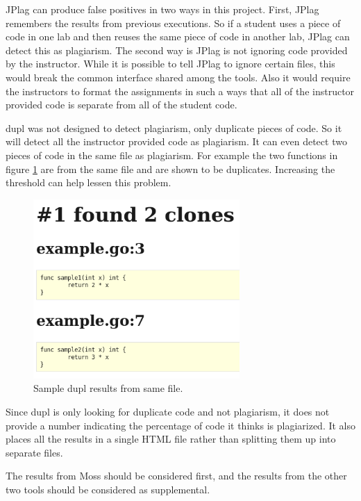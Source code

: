 \documentclass[journal,comsoc]{IEEEtran}
\begin{document}
	JPlag can produce false positives in two ways in this project. First, JPlag remembers the results from previous executions. So if a student uses a piece of code in one lab and then reuses the same piece of code in another lab, JPlag can detect this as plagiarism. The second way is JPlag is not ignoring code provided by the instructor. While it is possible to tell JPlag to ignore certain files, this would break the common interface shared among the tools. Also it would require the instructors to format the assignments in such a ways that all of the instructor provided code is separate from all of the student code.
	
	dupl was not designed to detect plagiarism, only duplicate pieces of code. So it will detect all the instructor provided code as plagiarism. It can even detect two pieces of code in the same file as plagiarism. For example the two functions in figure \ref{fig:duplSameFile} are from the same file and are shown to be duplicates. Increasing the threshold can help lessen this problem.
	
	\begin{figure}[h!]
		\includegraphics[width=0.7\textwidth]{duplSameFile2.png}
		\caption{Sample dupl results from same file.}
		\label{fig:duplSameFile}
	\end{figure}
	
	Since dupl is only looking for duplicate code and not plagiarism, it does not provide a number indicating the percentage of code it thinks is plagiarized. It also places all the results in a single HTML file rather than splitting them up into separate files.
	
	The results from Moss should be considered first, and the results from the other two tools should be considered as supplemental.
	
\end{document}
